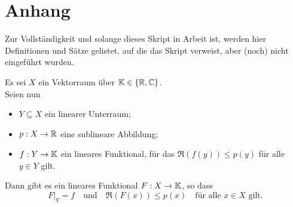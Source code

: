 

\chapter*{Anhang}  

Zur Vollständigkeit und solange dieses Skript in Arbeit ist, werden hier Definitionen und Sätze gelistet, auf die das Skript verweist, aber (noch) nicht eingeführt wurden.


\begin{satznbfr}  \label{satz:x-1-hahn-banach}
	Es sei $X$ ein Vektorraum über $\mathbb{K} \in \{ \mathbb{R}, \mathbb{C} \}$. \\
	Seien nun
	\begin{itemize}
		\item $Y \subseteq X$ ein linearer Unterraum;
		\item $p: X \rightarrow \mathbb{R}$ eine sublineare Abbildung;
		\item $f: Y \rightarrow \mathbb{K}$ ein lineares Funktional, für das $\Re(f(y)) \leq p(y)$ für alle $y \in Y$ gilt.
	\end{itemize}
	Dann gibt es ein lineares Funktional $F: X \rightarrow \mathbb{K}$, so dass
	\[ F|_{Y} = f \quad \text{und} \quad \Re(F(x)) \leq p(x) \quad \text{für alle } x \in X \text{ gilt.} \]
\end{satznbfr}



\newpage